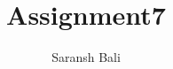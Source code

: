 \documentclass[journal,12pt,twocolumn]{IEEEtran}
\begin{document}
\makeatletter
{}
\makeatother
\let\StandardTheFigure\thefigure
\let\vec\mathbf
\renewcommand{\thefigure}{\theproblem}
\def\putbox#1#2#3{\makebox[0in][l]{\makebox[#1][l]{}\raisebox{\baselineskip}[0in][0in]{\raisebox{#2}[0in][0in]{#3}}}}
     \def\rightbox#1{\makebox[0in][r]{#1}}
     \def\centbox#1{\makebox[0in]{#1}}
     \def\topbox#1{\raisebox{-\baselineskip}[0in][0in]{#1}}
     \def\midbox#1{\raisebox{-0.5\baselineskip}[0in][0in]{#1}}
\vspace{3cm}
\title{Assignment7}
\author{Saransh Bali}
%
%
%
% 
%
\end{document}
